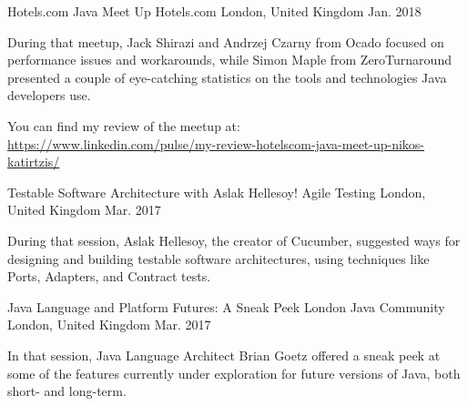 

\begin{cventries}

  \cventry
    {Hotels.com Java Meet Up} %
    {Hotels.com} %
    {London, United Kingdom} %
    {Jan. 2018} %
    {
      \begin{cvitems} %
        \item {During that meetup, Jack Shirazi and Andrzej Czarny from Ocado focused on performance issues and workarounds, while Simon Maple from ZeroTurnaround presented a couple of eye-catching statistics on the tools and technologies Java developers use.}
        \item {You can find my review of the meetup at: \\ \url{https://www.linkedin.com/pulse/my-review-hotelscom-java-meet-up-nikos-katirtzis/}}
      \end{cvitems}
    }

  \cventry
    {Testable Software Architecture with Aslak Hellesoy!} %
    {Agile Testing} %
    {London, United Kingdom} %
    {Mar. 2017} %
    {
      \begin{cvitems} %
        \item {During that session, Aslak Hellesoy, the creator of Cucumber, suggested ways for designing and building testable software architectures, using techniques like Ports, Adapters, and Contract tests.}
      \end{cvitems}
    }

  \cventry
    {Java Language and Platform Futures: A Sneak Peek} %
    {London Java Community} %
    {London, United Kingdom} %
    {Mar. 2017} %
    {
      \begin{cvitems} %
        \item {In that session, Java Language Architect Brian Goetz offered a sneak peek at some of the features currently under exploration for future versions of Java, both short- and long-term.}
      \end{cvitems}
    }  


\end{cventries}
